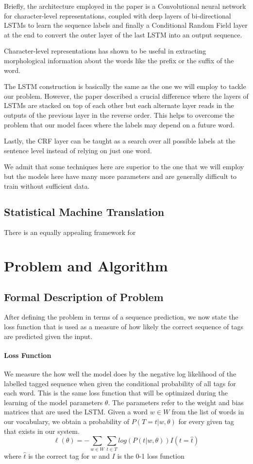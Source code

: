 \documentclass[fyp]{socreport}
\begin{document}
Briefly, the architecture employed in the paper is a Convolutional neural network
for character-level representations, coupled with deep layers of bi-directional
LSTMs to learn the sequence labels and finally a Conditional Random Field layer
at the end to convert the outer layer of the last LSTM into an output sequence.

Character-level representations has shown to be useful in extracting morphological
information about the words like the prefix or the suffix of the word.

The LSTM construction is basically the same as the one we will employ to tackle
our problem. However, the paper described a crucial difference where the
layers of LSTMs are stacked on top of each other but each alternate layer
reads in the outputs of the previous layer in the reverse order. This helps to
overcome the problem that our model faces where the labels may depend on a
future word.

Lastly, the CRF layer can be taught as a search over all possible labels at
the sentence level instead of relying on just one word.

We admit that some techniques here are superior to the one that we will employ
but the models here have many more parameters and are generally difficult to
train without sufficient data.


\section{Statistical Machine Translation}
There is an equally appealing framework for


\label{ch:related}


\chapter{Problem and Algorithm}
\section{Formal Description of Problem}
After defining the problem in terms of a sequence prediction, we now state the
loss function that is used as a measure of how likely the correct sequence of
tags are predicted given the input.

\subsubsection{Loss Function} We measure the how well the model does by the
negative log likelihood of the labelled tagged sequence when given the
conditional probability of all tags for each word. This is the same loss
function that will be optimized during the learning of the model parameters
$\theta$. The parameters refer to the weight and bias matrices that are used
the LSTM. Given a word $w \in W$ from the list of words in our vocabulary, we
obtain a probability of $P(T=t | w, \theta)$ for every given tag that exists in
our system.
\begin{equation}
  \ell(\theta) = -\sum_{w \in W} \sum_{t \in T} log(P(t | w, \theta)) I(t = \hat{t})
\end{equation}
where $\hat{t}$ is the correct tag for $w$ and $I$ is the 0-1 loss function
\end{document}
